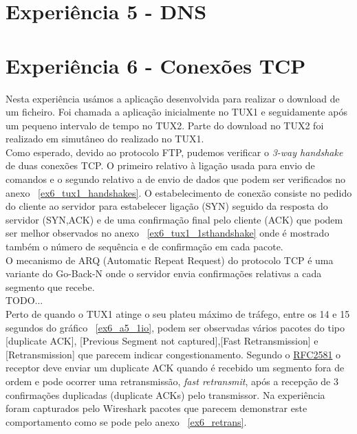 \documentclass[11pt,a4paper,reqno]{report}
\numberwithin{equation}{section}
\begin{document}
\section{Experiência 5 - DNS}

\section{Experiência 6 - Conexões TCP}

Nesta experiência usámos a aplicação desenvolvida para realizar o download de um ficheiro. Foi chamada a aplicação inicialmente no TUX1 e seguidamente após um pequeno intervalo de tempo no TUX2. Parte do download no TUX2 foi realizado em simutâneo do realizado no TUX1.\\

Como esperado, devido ao protocolo FTP, pudemos verificar o \emph{3-way handshake} de duas conexões TCP. O primeiro relativo à ligação usada para envio de comandos e o segundo relativo a de envio de dados que podem ser verificados no anexo ~\ref{ex6_tux1_handshakes}. O estabelecimento de conexão consiste no pedido do cliente ao servidor para estabelecer ligação (SYN) seguido da resposta do servidor (SYN,ACK) e de uma confirmação final pelo cliente (ACK) que podem ser melhor observados no anexo ~\ref{ex6_tux1_1sthandshake} onde é mostrado também o número de sequência e de confirmação em cada pacote.\\

O mecanismo de ARQ (Automatic Repeat Request) do protocolo TCP é uma variante do Go-Back-N onde o servidor envia confirmações relativas a cada segmento que recebe. \\

TODO...\\

Perto de quando o TUX1 atinge o seu plateu máximo de tráfego, entre os 14 e 15 segundos do gráfico ~\ref{ex6_a5_1io}, podem ser observadas vários pacotes do tipo [duplicate ACK], [Previous Segment not captured],[Fast Retransmission] e [Retransmission] que parecem indicar congestionamento.
Segundo o \href{http://www.ietf.org/rfc/rfc2581.txt}{RFC2581} o receptor deve enviar um duplicate ACK quando é recebido um segmento fora de ordem e pode ocorrer uma retransmissão, \emph{fast retransmit}, após a recepção de 3 confirmações duplicadas (duplicate ACKs) pelo transmissor. Na experiência foram capturados pelo Wireshark pacotes que parecem demonstrar este comportamento como se pode pelo anexo ~\ref{ex6_retrans}.\\
\end{document}
